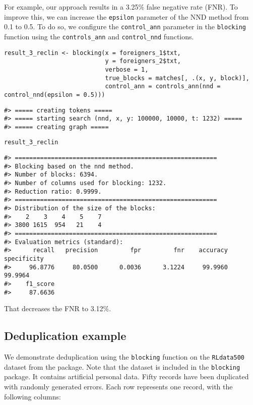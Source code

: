 For example, our approach results in a
3.25\% false negative
rate (FNR). To improve this, we can increase the \texttt{epsilon} parameter of
the NND method from 0.1 to 0.5. To do so, we configure the \texttt{control\_ann}
parameter in the \texttt{blocking} function using the \texttt{controls\_ann} and
\texttt{control\_nnd} functions.

\begin{verbatim}
result_3_reclin <- blocking(x = foreigners_1$txt,
                            y = foreigners_2$txt,
                            verbose = 1,
                            true_blocks = matches[, .(x, y, block)],
                            control_ann = controls_ann(nnd = control_nnd(epsilon = 0.5)))
\end{verbatim}

\begin{verbatim}
#> ===== creating tokens =====
#> ===== starting search (nnd, x, y: 100000, 10000, t: 1232) =====
#> ===== creating graph =====
\end{verbatim}

\begin{verbatim}
result_3_reclin
\end{verbatim}

\begin{verbatim}
#> ========================================================
#> Blocking based on the nnd method.
#> Number of blocks: 6394.
#> Number of columns used for blocking: 1232.
#> Reduction ratio: 0.9999.
#> ========================================================
#> Distribution of the size of the blocks:
#>    2    3    4    5    7 
#> 3800 1615  954   21    4 
#> ========================================================
#> Evaluation metrics (standard):
#>      recall   precision         fpr         fnr    accuracy specificity 
#>     96.8776     80.0500      0.0036      3.1224     99.9960     99.9964 
#>    f1_score 
#>     87.6636
\end{verbatim}

That decreases the FNR to
3.12\%.

\subsection{Deduplication example}\label{deduplication-example}

We demonstrate deduplication using the \texttt{blocking} function on the
\texttt{RLdata500} dataset from the  package. Note that
the dataset is included in the \texttt{blocking} package. It contains
artificial personal data. Fifty records have been duplicated with
randomly generated errors. Each row represents one record, with the
following columns:

